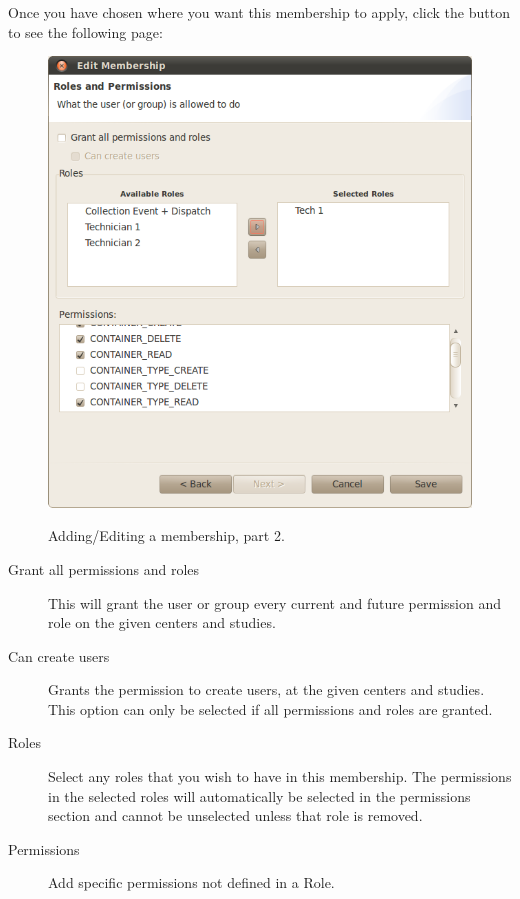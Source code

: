 Once you have chosen where you want this membership to apply, click the  button
to see the following page:

\begin{figure}[H]
  \centering
  \scalebox{0.5}
	   { \includegraphics*{screenshots/administration/edit_membership_2} }
	   \caption{Adding/Editing a membership, part 2.}
	   \label{fig:add_group}
\end{figure}

\begin{description}
\item[Grant all permissions and roles] This will grant the user or group every current
and future permission and role on the given centers and studies.
\item[Can create users] Grants the permission to create users, at the given centers
and studies. This option can only be selected if all permissions and roles are granted.
\item[Roles] Select any roles that you wish to have in this membership. The permissions
in the selected roles will automatically be selected in the permissions section and
cannot be unselected unless that role is removed.
\item[Permissions] Add specific permissions not defined in a Role.
\end{description}

